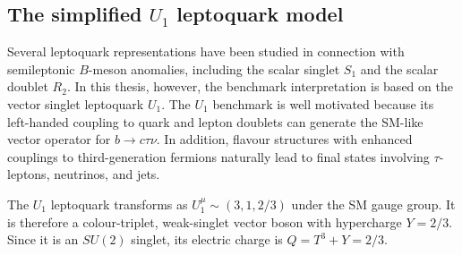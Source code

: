 

\subsection{The simplified $U_{1}$ leptoquark model}
\label{subsec:u1_simplified_model}

Several leptoquark representations have been studied in connection with semileptonic $B$-meson anomalies, including the scalar singlet $S_{1}$ and the scalar doublet $R_{2}$. 
In this thesis, however, the benchmark interpretation is based on the vector singlet leptoquark $U_{1}$. 
The $U_{1}$ benchmark is well motivated because its left-handed coupling to quark and lepton doublets can generate the SM-like vector operator for $b\rightarrow c\tau\nu$. 
In addition, flavour structures with enhanced couplings to third-generation fermions naturally lead to final states involving $\tau$-leptons, neutrinos, and jets.

The $U_{1}$ leptoquark transforms as
$U_{1}^{\mu}\sim(3,1,2/3)$
under the SM gauge group.
It is therefore a colour-triplet, weak-singlet vector boson with hypercharge $Y=2/3$. 
Since it is an $SU(2)$ singlet, its electric charge is $Q=T^{3}+Y=2/3$.

